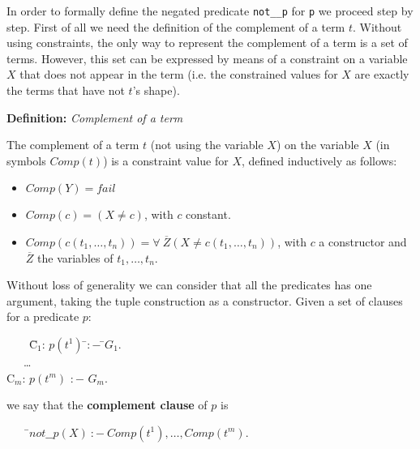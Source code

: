 \documentclass[]{llncs}
\newenvironment{mytabbing}
   {\vspace{0.3em}\begin{small}\begin{tabbing}}
   {\end{tabbing}\end{small}\vspace{0.3em}}
\begin{document}
In order to formally define the negated predicate {\tt not\_\_p}
for {\tt p} we proceed step by step. First of all we need the
definition of the complement of a term $t$. Without using constraints,
the only way to represent the complement of a term is a set of terms.
However, this set can be expressed by means of a constraint on a
variable $X$ that does not appear in the term (i.e. the constrained
values for $X$ are exactly the terms that have not $t$'s shape).
\bigskip

\noindent
{\bf Definition:} {\em Complement of a term}

\noindent
The complement of a term $t$ (not using the variable $X$)
on the variable $X$ (in symbols $Comp (t)$) is a constraint
value for $X$, defined inductively as follows:
\begin{itemize}
\item $Comp (Y) = fail$
\item $Comp (c) = (X \neq c)$, with $c$  constant.
\item $Comp (c (t_1, \ldots, t_n)) =
         \forall~ \overline{Z} (X \neq c (t_1, \ldots, t_n))$,
         with $c$ a constructor and $\overline{Z}$ the variables
         of $t_1, \ldots, t_n$.
\end{itemize}

Without loss of generality we can consider that all the predicates
has one argument, taking the tuple construction as a
constructor. Given a set of clauses for a predicate $p$:

\begin{mytabbing}
~~~~\=C$_1$: $p (t^1)$ \=$:-$ \=$G_1 $. \\
    \>~~~\ldots \\
    \>C$_m$: $p (t^m)$ \>$:-$\> $G_m $. 
\end{mytabbing}

\noindent
we say that the {\bf complement clause} of $p$ is

\begin{mytabbing}
~~~~\=$not\_\_p (X) ~:- ~Comp (t^1), \ldots, Comp (t^m)$. \\
\end{mytabbing}
\end{document}
